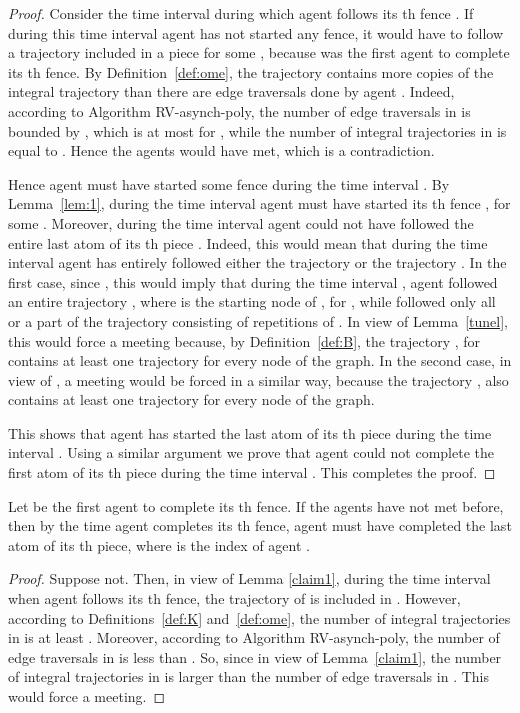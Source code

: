 \documentclass [11pt] {article}
\begin{document}
\begin{proof}
Consider the time interval  during which agent  follows its th fence . If during this time interval agent  has not started any fence,
it would have to follow a trajectory included in a piece  for some , because  was the first agent to complete its th fence.
By Definition~\ref{def:ome}, the trajectory  contains more copies of the integral trajectory {} than there are edge traversals done by agent . 
Indeed, according to Algorithm RV-asynch-poly, the number of {edge traversals} in  is bounded by {}, which is at most  for , while the number of integral trajectories  in  is equal to .
Hence the agents would have met, which is a contradiction.

Hence agent  must have started some fence during the time interval . By Lemma~\ref{lem:1}, during the time interval  agent  must have started its
th fence  , for some . Moreover, during the time interval  agent  could not have followed the entire last atom {} 
of its th piece . Indeed, this would mean that during the time interval  agent  has 
entirely followed either the trajectory  or the trajectory .
In the first case, since ,
this would imply that during the time interval , agent  followed an entire trajectory ,
where  is the starting node of , for
, while  followed only all or a part of the trajectory   consisting of repetitions of .
{In view of Lemma~\ref{tunel},} this would force a meeting because, by Definition~\ref{def:B},
the trajectory , for  contains at least one trajectory  for every node  of the graph. In the second case, in view of , a meeting would be forced in a similar way, because the trajectory , also contains at least one trajectory  for every node  of the graph.

This shows that  agent  has started the last atom {} of its th piece  during the time interval . Using a similar argument we prove that agent  could not 
complete the first atom {} of  its th piece during the time interval . This completes the proof. 
\end{proof}




\begin{lemma}
\label{claim2}
Let  be the first agent to complete its th fence. If the agents have not met before, then by the time agent  completes its th fence,
agent  must have completed the last {atom } of its th piece, where  is the index of agent .
\end{lemma}

\begin{proof}
Suppose not. Then, in view of Lemma \ref{claim1}, during the time interval when agent  follows its th fence, the trajectory of  is included in {}. However, according to {Definitions~\ref{def:K} and~\ref{def:ome}}, the number of integral trajectories  in  is {at least} . Moreover, according to Algorithm RV-asynch-poly, the number of {edge traversals} in {} is less than . So, since  in view of Lemma~\ref{claim1}, the number of integral trajectories in  is larger than the number of {edge traversals} in {}. This would force a meeting. 
\end{proof}
\end{document}
